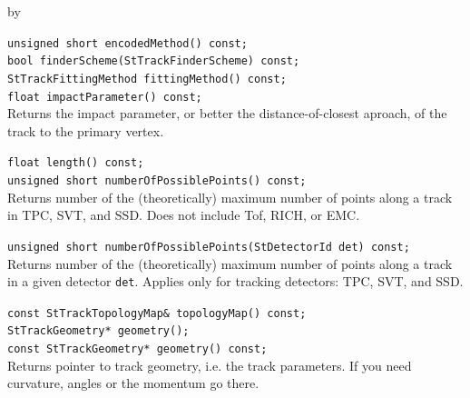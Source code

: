 \documentclass[twoside]{article}
\newcommand{\entrylabel}[1]{\mbox{\textbf{{#1}}}\hfil}%
\newenvironment{entry}
{\begin{list}{}%
    {\renewcommand{\makelabel}{\entrylabel}%
     \setlength{\labelwidth}{90pt}%
     \setlength{\leftmargin}{\labelwidth}
     \advance\leftmargin by \labelsep%
      }%
    }%
  {\end{list}}
\newcommand{\Entrylabel}[1]%
{\raisebox{0pt}[1ex][0pt]{\makebox[\labelwidth][l]%
    {\parbox[t]{\labelwidth}{\hspace{0pt}\textbf{{#1}}}}}}
\newenvironment{Entry}%
{\renewcommand{\entrylabel}{\Entrylabel}\begin{entry}}%
  {\end{entry}}
\begin{document}
\begin{Entry}
    \verb+unsigned short encodedMethod() const;+\\

    \verb+bool finderScheme(StTrackFinderScheme) const;+\\

    \verb+StTrackFittingMethod fittingMethod() const;+\\

    \verb+float impactParameter() const;+\\
    Returns the impact parameter, or better the distance-of-closest
    aproach, of the track to the primary vertex.
    
    \verb+float length() const;+\\

    \verb+unsigned short numberOfPossiblePoints() const;+\\
    Returns number of the (theoretically) maximum number of
    points along a track in TPC, SVT, and SSD. Does not include
    Tof, RICH, or EMC.
    
    \verb+unsigned short numberOfPossiblePoints(StDetectorId det) const;+\\
    Returns number of the (theoretically) maximum number of
    points along a track in a given detector \texttt{det}.
    Applies only for tracking detectors: TPC, SVT, and SSD.

    \verb+const StTrackTopologyMap& topologyMap() const;+\\

    \verb+StTrackGeometry* geometry();+\\
    \verb+const StTrackGeometry* geometry() const;+\\
    Returns pointer to track geometry, i.e. the track parameters.
    If you need curvature, angles or the momentum go there.
    

\end{Entry}
\end{document}
